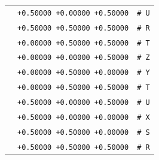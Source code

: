 \documentclass[11pt,a4paper]{article}
\begin{document}
\begin{tabular}{lll}
&\texttt{+0.50000  +0.00000  +0.50000}&\texttt{\# U}\\
&\texttt{+0.50000  +0.50000  +0.50000}&\texttt{\# R}\\
&\texttt{+0.00000  +0.50000  +0.50000}&\texttt{\# T}\\
&\texttt{+0.00000  +0.00000  +0.50000}&\texttt{\# Z}\\
&\texttt{+0.00000  +0.50000  +0.00000}&\texttt{\# Y}\\
&\texttt{+0.00000  +0.50000  +0.50000}&\texttt{\# T}\\
&\texttt{+0.50000  +0.00000  +0.50000}&\texttt{\# U}\\
&\texttt{+0.50000  +0.00000  +0.00000}&\texttt{\# X}\\
&\texttt{+0.50000  +0.50000  +0.00000}&\texttt{\# S}\\
&\texttt{+0.50000  +0.50000  +0.50000}&\texttt{\# R}\\
\end{tabular}
\newpage
\end{document}
